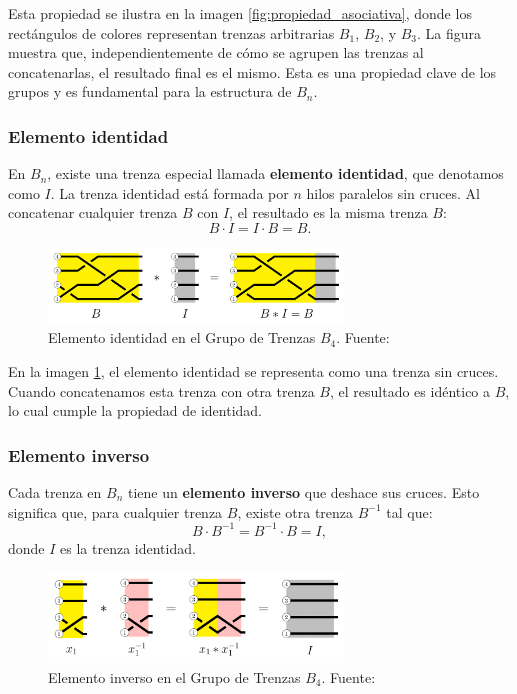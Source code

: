 Esta propiedad se ilustra en la imagen \ref{fig:propiedad_asociativa}, donde los rectángulos de colores representan trenzas arbitrarias \( B_1 \), \( B_2 \), y \( B_3 \). La figura muestra que, independientemente de cómo se agrupen las trenzas al concatenarlas, el resultado final es el mismo. Esta es una propiedad clave de los grupos y es fundamental para la estructura de \( B_n \).

\subsubsection{Elemento identidad}

En \( B_n \), existe una trenza especial llamada \textbf{elemento identidad}, que denotamos como \( I \). La trenza identidad está formada por \( n \) hilos paralelos sin cruces. Al concatenar cualquier trenza \( B \) con \( I \), el resultado es la misma trenza \( B \):
\[
B \cdot I = I \cdot B = B.
\]

\begin{figure}[h!]
    \centering
    \includegraphics[width=0.7\textwidth]{figures/chapters/1_def_grupo/elemento_neutro.png}
    \caption{Elemento identidad en el Grupo de Trenzas $B_4$. Fuente: \cite{ArithmeticBraids}}
    \label{fig:elemento_neutro}
\end{figure}

En la imagen \ref{fig:elemento_neutro}, el elemento identidad se representa como una trenza sin cruces. Cuando concatenamos esta trenza con otra trenza \( B \), el resultado es idéntico a \( B \), lo cual cumple la propiedad de identidad.

\subsubsection{Elemento inverso}

Cada trenza en \( B_n \) tiene un \textbf{elemento inverso} que deshace sus cruces. Esto significa que, para cualquier trenza \( B \), existe otra trenza \( B^{-1} \) tal que:
\[
B \cdot B^{-1} = B^{-1} \cdot B = I,
\]
donde \( I \) es la trenza identidad.

\begin{figure}[h!]
    \centering
    \includegraphics[width=0.7\textwidth]{figures/chapters/1_def_grupo/elemento_inverso1.png}
    \caption{Elemento inverso en el Grupo de Trenzas $B_4$. Fuente: \cite{ArithmeticBraids}}
    \label{fig:elemento_inverso}
\end{figure}

